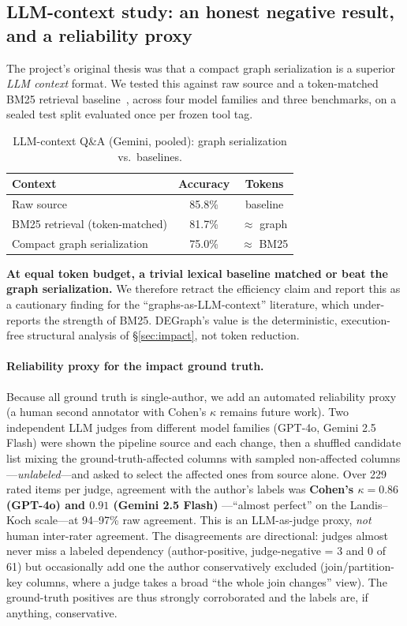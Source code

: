 \documentclass[11pt]{article}
\begin{document}
\subsection{LLM-context study: an honest negative result, and a reliability proxy}
\label{sec:llm}
The project's original thesis was that a compact graph serialization is a superior
\emph{LLM context} format. We tested this against raw source and a token-matched
BM25 retrieval baseline~\cite{bm25}, across four model families and three benchmarks, on a
sealed test split evaluated once per frozen tool tag.

\begin{table}[h]
\centering
\caption{LLM-context Q\&A (Gemini, pooled): graph serialization vs.\ baselines.}
\label{tab:llm}
\small
\begin{tabular}{@{}lcc@{}}
\toprule
Context & Accuracy & Tokens \\
\midrule
Raw source & 85.8\% & baseline \\
BM25 retrieval (token-matched) & 81.7\% & $\approx$ graph \\
Compact graph serialization & 75.0\% & $\approx$ BM25 \\
\bottomrule
\end{tabular}
\end{table}

\textbf{At equal token budget, a trivial lexical baseline matched or beat the graph
serialization.} We therefore retract the efficiency claim and report this as a
cautionary finding for the ``graphs-as-LLM-context'' literature, which under-reports
the strength of BM25. DEGraph's value is the deterministic, execution-free
structural analysis of \S\ref{sec:impact}, not token reduction.

\paragraph{Reliability proxy for the impact ground truth.} Because all ground truth
is single-author, we add an automated reliability proxy (a human second annotator
with Cohen's $\kappa$ remains future work). Two independent LLM judges from different
model families (GPT-4o, Gemini 2.5 Flash) were shown the pipeline source and each
change, then a shuffled candidate list mixing the ground-truth-affected columns with
sampled non-affected columns---\emph{unlabeled}---and asked to select the affected
ones from source alone. Over 229 rated items per judge, agreement with the author's
labels was \textbf{Cohen's $\kappa=0.86$ (GPT-4o) and $0.91$ (Gemini 2.5 Flash)}
---``almost perfect'' on the Landis--Koch scale---at 94--97\% raw agreement. This is
an LLM-as-judge proxy, \emph{not} human inter-rater agreement. The disagreements are
directional: judges almost never miss a labeled dependency (author-positive,
judge-negative = 3 and 0 of 61) but occasionally add one the author conservatively
excluded (join/partition-key columns, where a judge takes a broad ``the whole join
changes'' view). The ground-truth positives are thus strongly corroborated and the
labels are, if anything, conservative.
\end{document}

